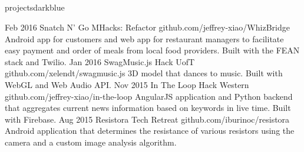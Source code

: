 \documentclass{resume}
\begin{document}
\begin{main}
		\section{\faFolder}{projects}{darkblue}
			\begin{entrylist}
				\rightentry%
					{Feb 2016}%
					{Snatch N' Go}%
					{MHacks: Refactor}%
					{github.com/jeffrey-xiao/WhizBridge}%
					{Android app for customers and web app for restaurant managers to facilitate easy payment and order of meals from local food providers. Built with the FEAN stack and Twilio.}
				\rightentry%
					{Jan 2016}%
					{SwagMusic.js}%
					{Hack UofT}%
					{github.com/xelendt/swagmusic.js}%
					{3D model that dances to music. Built with WebGL and Web Audio API.}
				\rightentry%
					{Nov 2015}%
					{In The Loop}%
					{Hack Western}%
					{github.com/jeffrey-xiao/in-the-loop}%
					{AngularJS application and Python backend that aggregates current news information based on keywords in live time. Built with Firebase.}
				\rightentry%
					{Aug 2015}%
					{Resistora}%
					{Tech Retreat}%
					{github.com/iburinoc/resistora}%
					{Android application that determines the resistance of various resistors using the camera and a custom image analysis algorithm.}
			\end{entrylist}	
	\end{main}
\end{document}
